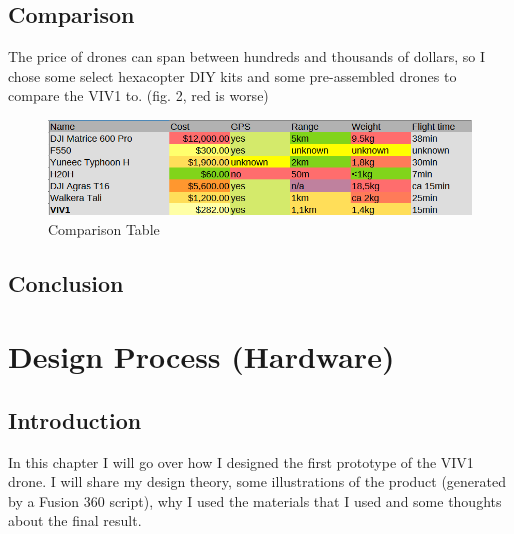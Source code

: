 \documentclass{hitec}
\begin{document}
	\subsection{Comparison}
	The price of drones can span between hundreds and thousands of dollars, so I chose some select hexacopter DIY kits and some pre-assembled drones to compare the VIV1 to. (fig. 2, red is worse)
		\begin{figure}[h]
		\centering
		\includegraphics[width=\linewidth]{comp}
		\caption{Comparison Table}
		\label{fig:ct}
	\end{figure}
	\subsection{Conclusion}
	\pagebreak
	\section{Design Process (Hardware)}
	\subsection{Introduction}
	In this chapter I will go over how I designed the first prototype of the VIV1 drone. I will share my design theory, some illustrations of the product (generated by a Fusion 360 script), why I used the materials that I used and some thoughts about the final result.
\end{document}
